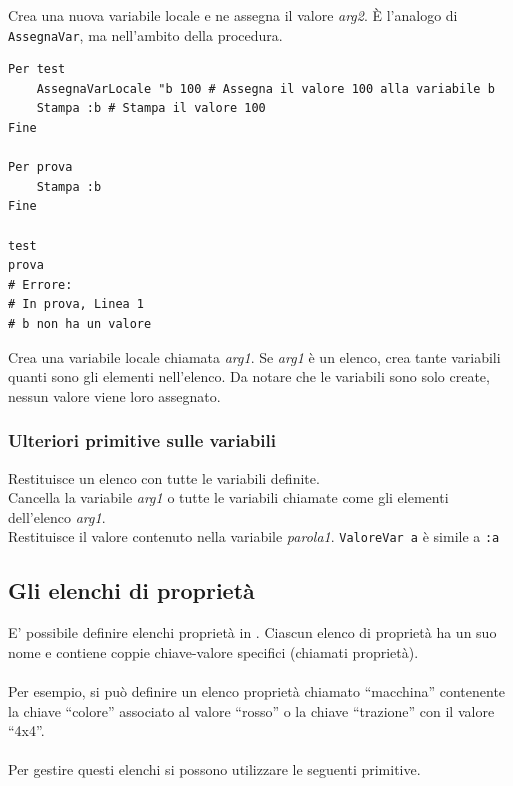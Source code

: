 Crea una nuova variabile locale e ne assegna il valore \textit{arg2}. \`{E} l'analogo di \texttt{AssegnaVar}, ma nell'ambito della procedura.\\
\begin{lstlisting}[caption="Esempio di funzionamento delle variabili locali"]
Per test
	AssegnaVarLocale "b 100 # Assegna il valore 100 alla variabile b
	Stampa :b # Stampa il valore 100
Fine

Per prova
	Stampa :b
Fine

test
prova
# Errore: 
# In prova, Linea 1
# b non ha un valore
\end{lstlisting}

Crea una variabile locale chiamata \textit{arg1}. Se \textit{arg1} è un elenco, crea tante variabili quanti sono gli elementi nell'elenco. Da notare che le variabili sono solo create, nessun valore viene loro assegnato.\\


\subsubsection{Ulteriori primitive sulle variabili} %
Restituisce un elenco con tutte le variabili definite.\\

 Cancella la variabile \textit{arg1} o tutte le variabili chiamate come gli elementi dell'elenco \textit{arg1}.\\

Restituisce il valore contenuto nella variabile \textit{parola1}. \texttt{ValoreVar \textquotedbl a} è simile a \texttt{:a}\\



\subsection{Gli elenchi di proprietà}
E' possibile definire elenchi proprietà in \xlogo. Ciascun elenco di proprietà ha un suo nome e contiene coppie chiave-valore specifici (chiamati proprietà).\\ \\
Per esempio, si può definire un elenco proprietà chiamato ``macchina'' contenente la chiave ``colore'' associato al valore ``rosso'' o la chiave ``trazione'' con il valore ``4x4''.\\ \\
Per gestire questi elenchi si possono utilizzare le seguenti primitive.\\

